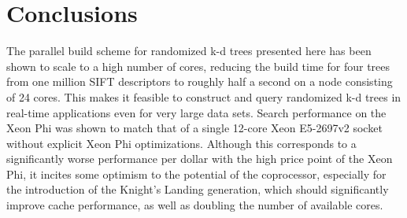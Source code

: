\section{Conclusions}
\label{sec:conclusions}


The parallel build scheme for randomized k-d trees presented here has been shown to scale to a high number of cores, reducing the build time for four trees from one million SIFT descriptors to roughly half a second on a node consisting of 24 cores. This makes it feasible to construct and query randomized k-d trees in real-time applications even for very large data sets. Search performance on the Xeon Phi was shown to match that of a single 12-core Xeon E5-2697v2 socket
without explicit Xeon Phi optimizations. Although this corresponds to a significantly worse performance per dollar with the high price point of the Xeon Phi, it incites some optimism to the potential of the coprocessor, especially for the introduction of the Knight's Landing generation, which should significantly improve cache performance, as well as doubling the number of available cores. 

